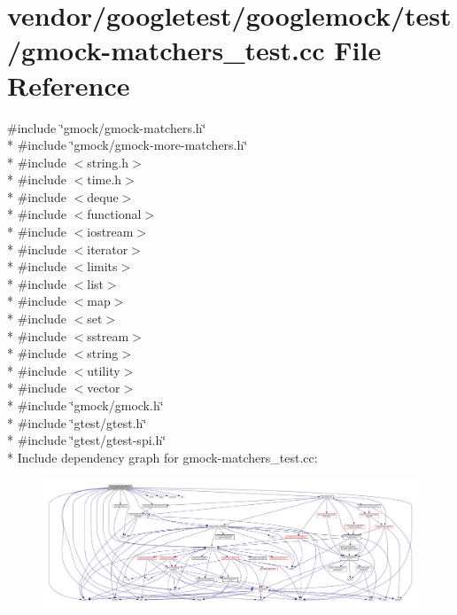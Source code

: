 \hypertarget{gmock-matchers__test_8cc}{}\section{vendor/googletest/googlemock/test/gmock-\/matchers\+\_\+test.cc File Reference}
\label{gmock-matchers__test_8cc}
{\ttfamily \#include \char`\"{}gmock/gmock-\/matchers.\+h\char`\"{}}\\*
{\ttfamily \#include \char`\"{}gmock/gmock-\/more-\/matchers.\+h\char`\"{}}\\*
{\ttfamily \#include $<$string.\+h$>$}\\*
{\ttfamily \#include $<$time.\+h$>$}\\*
{\ttfamily \#include $<$deque$>$}\\*
{\ttfamily \#include $<$functional$>$}\\*
{\ttfamily \#include $<$iostream$>$}\\*
{\ttfamily \#include $<$iterator$>$}\\*
{\ttfamily \#include $<$limits$>$}\\*
{\ttfamily \#include $<$list$>$}\\*
{\ttfamily \#include $<$map$>$}\\*
{\ttfamily \#include $<$set$>$}\\*
{\ttfamily \#include $<$sstream$>$}\\*
{\ttfamily \#include $<$string$>$}\\*
{\ttfamily \#include $<$utility$>$}\\*
{\ttfamily \#include $<$vector$>$}\\*
{\ttfamily \#include \char`\"{}gmock/gmock.\+h\char`\"{}}\\*
{\ttfamily \#include \char`\"{}gtest/gtest.\+h\char`\"{}}\\*
{\ttfamily \#include \char`\"{}gtest/gtest-\/spi.\+h\char`\"{}}\\*
Include dependency graph for gmock-\/matchers\+\_\+test.cc\+:
\nopagebreak
\begin{figure}[H]
\begin{center}
\leavevmode
\includegraphics[width=350pt]{gmock-matchers__test_8cc__incl}
\end{center}
\end{figure}
